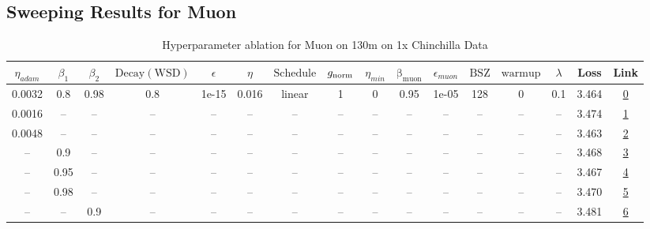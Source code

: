 \subsection{Sweeping Results for Muon}%
\begin{table}[H]
\centering
\caption{Hyperparameter ablation for Muon on 130m on 1x Chinchilla Data}
\label{tab:ablation_muon_130m_on_1x_chinchilla_data}
\begin{tabular}{cccccccccccccccc}
\toprule
$\eta_{adam}$ & $\beta_1$ & $\beta_2$ & $\mathrm{Decay (WSD)}$ & $\epsilon$ & $\eta$ & $\mathrm{Schedule}$ & $g_{\mathrm{norm}}$ & $\eta_{min}$ & $\mathrm{\beta_{muon}}$ & $\epsilon_{muon}$ & $\mathrm{BSZ}$ & $\mathrm{warmup}$ & $\lambda$ & Loss & Link \\
\midrule
0.0032 & 0.8 & 0.98 & 0.8 & 1e-15 & 0.016 & linear & 1 & 0 & 0.95 & 1e-05 & 128 & 0 & 0.1 & 3.464 & \href{https://wandb.ai/marin-community/optimizer-scaling/runs/sweep-130m-2B-muon02b4fclr0.016-wd0.1-minlr0-warmup0-b10.8-b20.9-9c2fe9}{0} \\
\midrule
0.0016 & -- & -- & -- & -- & -- & -- & -- & -- & -- & -- & -- & -- & -- & 3.474 & \href{https://wandb.ai/marin-community/optimizer-scaling/runs/sweep-130m-2B-muon89fb4blr0.016-wd0.1-minlr0-warmup0-b10.8-b20.9-2c3744}{1} \\
0.0048 & -- & -- & -- & -- & -- & -- & -- & -- & -- & -- & -- & -- & -- & 3.463 & \href{https://wandb.ai/marin-community/optimizer-scaling/runs/sweep-130m-2B-muon19b6eclr0.016-wd0.1-minlr0-warmup0-b10.8-b20.9-d27415}{2} \\
-- & 0.9 & -- & -- & -- & -- & -- & -- & -- & -- & -- & -- & -- & -- & 3.468 & \href{https://wandb.ai/marin-community/optimizer-scaling/runs/sweep-130m-2B-muon9087d6lr0.016-wd0.1-minlr0-warmup0-b10.9-b20.9-7b1a75}{3} \\
-- & 0.95 & -- & -- & -- & -- & -- & -- & -- & -- & -- & -- & -- & -- & 3.467 & \href{https://wandb.ai/marin-community/optimizer-scaling/runs/sweep-130m-2B-muon4082ddlr0.016-wd0.1-minlr0-warmup0-b10.95-b20.-af0f73}{4} \\
-- & 0.98 & -- & -- & -- & -- & -- & -- & -- & -- & -- & -- & -- & -- & 3.470 & \href{https://wandb.ai/marin-community/optimizer-scaling/runs/sweep-130m-2B-muonb222a7lr0.016-wd0.1-minlr0-warmup0-b10.98-b20.-7cb250}{5} \\
-- & -- & 0.9 & -- & -- & -- & -- & -- & -- & -- & -- & -- & -- & -- & 3.481 & \href{https://wandb.ai/marin-community/optimizer-scaling/runs/sweep-130m-2B-muond0f9b1lr0.016-wd0.1-minlr0-warmup0-b10.8-b20.9-38cfa8}{6} \\

\end{tabular}
\end{table}

